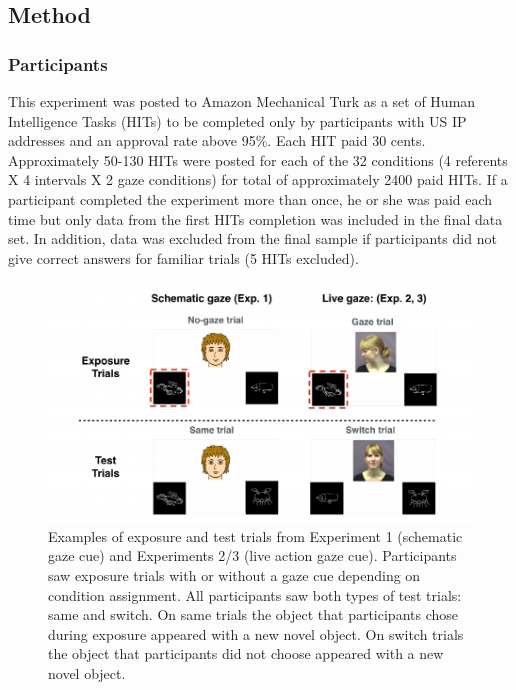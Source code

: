 \documentclass[a4paper,man,natbib]{apa6}
\newenvironment{CodeChunk}{}{}
\begin{document}
\subsection{Method}\label{method}

\subsubsection{Participants}\label{participants}

This experiment was posted to Amazon Mechanical Turk as a set of Human
Intelligence Tasks (HITs) to be completed only by participants with US
IP addresses and an approval rate above 95\%. Each HIT paid 30 cents.
Approximately 50-130 HITs were posted for each of the 32 conditions (4
referents X 4 intervals X 2 gaze conditions) for total of approximately
2400 paid HITs. If a participant completed the experiment more than
once, he or she was paid each time but only data from the first HITs
completion was included in the final data set. In addition, data was
excluded from the final sample if participants did not give correct
answers for familiar trials (5 HITs excluded).

\begin{CodeChunk}
\begin{figure}
\includegraphics{figs/stimuli-1} \caption[Examples of exposure and test trials from Experiment 1 (schematic gaze cue) and Experiments 2/3 (live action gaze cue)]{Examples of exposure and test trials from Experiment 1 (schematic gaze cue) and Experiments 2/3 (live action gaze cue). Participants saw exposure trials with or without a gaze cue depending on condition assignment. All participants saw both types of test trials: same and switch. On same trials the object that participants chose during exposure appeared with a new novel object. On switch trials the object that participants did not choose appeared with a new novel object.}\label{fig:stimuli}
\end{figure}
\end{CodeChunk}
\end{document}

